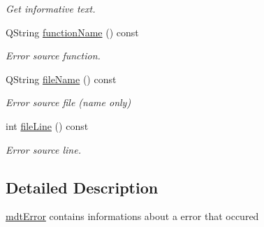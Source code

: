 \begin{DoxyCompactItemize}
\begin{DoxyCompactList}\small\item\em Get informative text. \end{DoxyCompactList}\item 
\hypertarget{classmdt_error_abff9bc71ff554f6f6189be88b0afa731}{
QString \hyperlink{classmdt_error_abff9bc71ff554f6f6189be88b0afa731}{functionName} () const }
\label{classmdt_error_abff9bc71ff554f6f6189be88b0afa731}

\begin{DoxyCompactList}\small\item\em Error source function. \end{DoxyCompactList}\item 
\hypertarget{classmdt_error_af7c2c371678ebd45698a990502addbd8}{
QString \hyperlink{classmdt_error_af7c2c371678ebd45698a990502addbd8}{fileName} () const }
\label{classmdt_error_af7c2c371678ebd45698a990502addbd8}

\begin{DoxyCompactList}\small\item\em Error source file (name only) \end{DoxyCompactList}\item 
\hypertarget{classmdt_error_a7f5a9ac5e896ba24009bcadddcfe79cb}{
int \hyperlink{classmdt_error_a7f5a9ac5e896ba24009bcadddcfe79cb}{fileLine} () const }
\label{classmdt_error_a7f5a9ac5e896ba24009bcadddcfe79cb}

\begin{DoxyCompactList}\small\item\em Error source line. \end{DoxyCompactList}\end{DoxyCompactItemize}


\subsection{Detailed Description}
\hyperlink{classmdt_error}{mdtError} contains informations about a error that occured 

